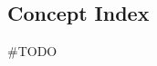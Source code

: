 \documentclass[class=book, crop=false]{standalone}
\begin{document}
\begin{CJK}{UTF8}{gbsn}

\chapter*{Concept Index}

\#TODO

\cleardoublepage

\end{CJK}
\end{document}
